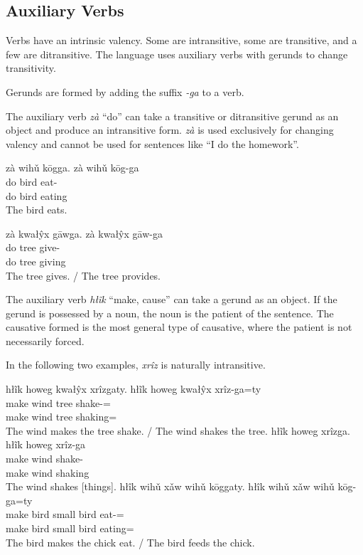 \subsection{Auxiliary Verbs}\label{subsec:auxiliary-verbs}

Verbs have an intrinsic valency.
Some are intransitive, some are transitive, and a few are ditransitive.
The language uses auxiliary verbs with gerunds to change transitivity.

Gerunds are formed by adding the suffix \textit{-ga} to a verb.

The auxiliary verb \textit{zà} ``do''
can take a transitive or ditransitive gerund as an object
and produce an intransitive form.
\textit{zà} is used exclusively for changing valency
and cannot be used for sentences like ``I do the homework''.

\begin{exe}
    \ex
    \glt
    zà wihǔ kōgga.
    \glll
    zà wihǔ kōg-ga \\
    do bird eat-\Ger{} \\
    do bird eating \\
    \glt
    The bird eats.
\end{exe}

\begin{exe}
    \ex
    \glt
    zà kwałŷx gāwga.
    \glll
    zà kwałŷx gāw-ga \\
    do tree give-\Ger{} \\
    do tree giving \\
    \glt
    The tree gives.
    /
    The tree provides.
\end{exe}

The auxiliary verb \textit{hłĩk} ``make, cause''
can take a gerund as an object.
If the gerund is possessed by a noun,
the noun is the patient of the sentence.
The causative formed is the most general type of causative,
where the patient is not necessarily forced.

In the following two examples,
\textit{xrîz} is naturally intransitive.

\begin{exe}
    \ex
    \glt
    hłĩk howeg kwałŷx xrîzgaty.
    \glll
    hłĩk howeg kwałŷx xrîz-ga=ty \\
    make wind tree shake-\Ger{}=\Poss{} \\
    make wind tree shaking=\Poss{} \\
    \glt
    The wind makes the tree shake.
    /
    The wind shakes the tree.
    \ex
    \glt
    hłĩk howeg xrîzga.
    \glll
    hłĩk howeg xrîz-ga \\
    make wind shake-\Ger{} \\
    make wind shaking \\
    \glt
    The wind shakes [things].
    \ex
    \glt
    hłîk wihǔ xǎw wihǔ kōggaty.
    \glll
    hłîk wihǔ xǎw wihǔ kōg-ga=ty \\
    make bird small bird eat-\Ger{}=\Poss{} \\
    make bird small bird eating=\Poss{} \\
    \glt
    The bird makes the chick eat.
    /
    The bird feeds the chick.
\end{exe}


